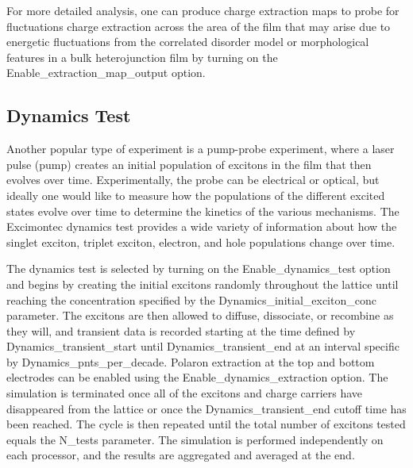 \documentclass[%
 reprint,onecolumn,notitlepage,
superscriptaddress,longbibliography,
 amsmath,amssymb,
 aps,rmp,floatfix,
]{revtex4-1}
\begin{document}
For more detailed analysis, one can produce charge extraction maps to probe for fluctuations charge extraction across the area of the film that may arise due to energetic fluctuations from the correlated disorder model or morphological features in a bulk heterojunction film by turning on the Enable\_extraction\_map\_output option.

\subsection{Dynamics Test}

Another popular type of experiment is a pump-probe experiment, where a laser pulse (pump) creates an initial population of excitons in the film that then evolves over time.
Experimentally, the probe can be electrical or optical, but ideally one would like to measure how the populations of the different excited states evolve over time to determine the kinetics of the various mechanisms.
The Excimontec dynamics test provides a wide variety of information about how the singlet exciton, triplet exciton, electron, and hole populations change over time.

The dynamics test is selected by turning on the Enable\_dynamics\_test option and begins by creating the initial excitons randomly throughout the lattice until reaching the concentration specified by the Dynamics\_initial\_exciton\_conc parameter.
The excitons are then allowed to diffuse, dissociate, or recombine as they will, and transient data is recorded starting at the time defined by Dynamics\_transient\_start until Dynamics\_transient\_end at an interval specific by Dynamics\_pnts\_per\_decade.
Polaron extraction at the top and bottom electrodes can be enabled using the Enable\_dynamics\_extraction option. 
The simulation is terminated once all of the excitons and charge carriers have disappeared from the lattice or once the Dynamics\_transient\_end cutoff time has been reached.
The cycle is then repeated until the total number of excitons tested equals the N\_tests parameter.
The simulation is performed independently on each processor, and the results are aggregated and averaged at the end.
\end{document}
